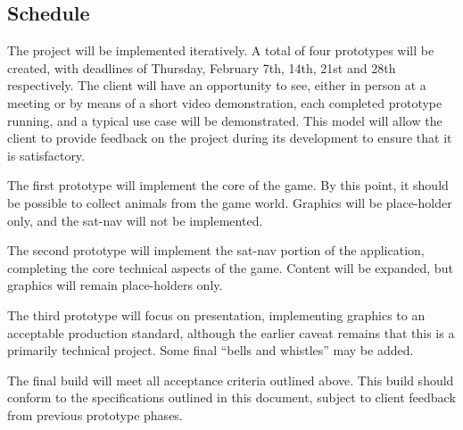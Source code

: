 \documentclass[12pt,a4paper,twoside]{article}
\begin{document}
\subsection{Schedule}
The project will be implemented iteratively.
A total of four prototypes will be created, with deadlines of Thursday, February 7th, 14th, 21st and 28th respectively.
The client will have an opportunity to see, either in person at a meeting or by means of a short video demonstration, each completed prototype running, and a typical use case will be demonstrated.
This model will allow the client to provide feedback on the project during its development to ensure that it is satisfactory.

The first prototype will implement the core of the game. By this point, it should be possible to collect animals from the game world. Graphics will be place-holder only, and the sat-nav will not be implemented.

The second prototype will implement the sat-nav portion of the application, completing the core technical aspects of the game. Content will be expanded, but graphics will remain place-holders only.

The third prototype will focus on presentation, implementing graphics to an acceptable production standard, although the earlier caveat remains that this is a primarily technical project. Some final ``bells and whistles'' may be added.

The final build will meet all acceptance criteria outlined above. This build should conform to the specifications outlined in this document, subject to client feedback from previous prototype phases.
\end{document}
